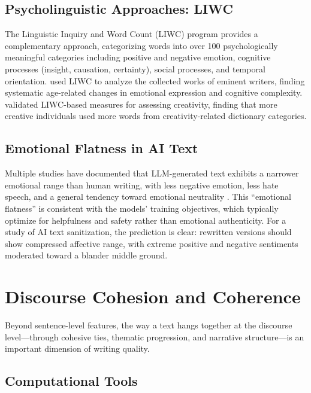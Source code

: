 \documentclass[12pt,a4paper]{article}
\begin{document}
\subsection{Psycholinguistic Approaches: LIWC}

The Linguistic Inquiry and Word Count (LIWC) program \citep{tausczik2010psychological, pennebaker1999linguistic} provides a complementary approach, categorizing words into over 100 psychologically meaningful categories including positive and negative emotion, cognitive processes (insight, causation, certainty), social processes, and temporal orientation. \citet{pennebaker2003aging} used LIWC to analyze the collected works of eminent writers, finding systematic age-related changes in emotional expression and cognitive complexity. \citet{kelley2021language} validated LIWC-based measures for assessing creativity, finding that more creative individuals used more words from creativity-related dictionary categories.

\subsection{Emotional Flatness in AI Text}

Multiple studies have documented that LLM-generated text exhibits a narrower emotional range than human writing, with less negative emotion, less hate speech, and a general tendency toward emotional neutrality \citep{tang2024survey}. This ``emotional flatness'' is consistent with the models' training objectives, which typically optimize for helpfulness and safety rather than emotional authenticity. For a study of AI text sanitization, the prediction is clear: rewritten versions should show compressed affective range, with extreme positive and negative sentiments moderated toward a blander middle ground.

\section{Discourse Cohesion and Coherence}

Beyond sentence-level features, the way a text hangs together at the discourse level---through cohesive ties, thematic progression, and narrative structure---is an important dimension of writing quality.

\subsection{Computational Tools}
\end{document}
